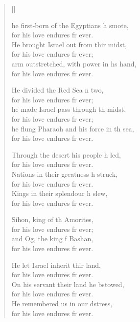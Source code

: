 \settowidth{\versewidth}{he flung Pharaoh and his force in the sea, *}
\begin{verse}[\versewidth]
  \begin{patverse}
he first-born of the Egyptians h smote,\Med\\
    for his love endures fr ever.\\
He brought Israel out from thir midst,\Med\\
    for his love endures fr ever;\\
arm outstretched, with power in h\pointup{\i}s hand,\Med\\
    for his love endures fr ever.

He divided the Red Sea \pointup{\i}n two,\Med\\
    for his love endures fr ever;\\
he made Israel pass through th midst,\Med\\
    for his love endures fr ever;\\
he flung Pharaoh and his force in th sea,\Med\\
    for his love endures fr ever.

Through the desert his people h led,\Med\\
    for his love endures fr ever.\\
Nations in their greatness h struck,\Med\\
    for his love endures fr ever.\\
Kings in their splendour h slew,\Med\\
    for his love endures fr ever.

Sihon, king of th Amorites,\Med\\
    for his love endures fr ever;\\
and Og, the king f Bashan,\Med\\
    for his love endures fr ever.

He let Israel inherit thir land,\Med\\
    for his love endures fr ever.\\
On his servant their land he bstowed,\Med\\
    for his love endures fr ever.\\
He remembered us in our d\pointup{\i}stress,\Med\\
    for his love endures fr ever.


\end{patverse}
\end{verse}
